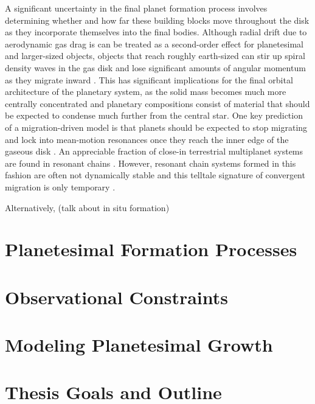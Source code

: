 A significant uncertainty in the final planet formation process involves determining whether and how far these building blocks move throughout the disk as they incorporate themselves into the final bodies. Although radial drift due to aerodynamic gas drag is can be treated as a second-order effect for planetesimal and larger-sized objects, objects that reach roughly earth-sized can stir up spiral density waves in the gas disk and lose significant amounts of angular momentum as they migrate inward \cite{ward97}. This has significant implications for the final orbital architecture of the planetary system, as the solid mass becomes much more centrally concentrated and planetary compositions consist of material that should be expected to condense much further from the central star. One key prediction of a migration-driven model is that planets should be expected to stop migrating and lock into mean-motion resonances once they reach the inner edge of the gaseous disk \cite{hands14}. An appreciable fraction of close-in terrestrial multiplanet systems are found in resonant chains \cite{gillon16, gillon17, christiansen18, agol21, leleu21}. However, resonant chain systems formed in this fashion are often not dynamically stable and this telltale signature of convergent migration is only temporary \cite{terquem07, pierens11, izidoro17, mcnally19}.

Alternatively, (talk about in situ formation)


\section{Planetesimal Formation Processes}
\section{Observational Constraints}
\section{Modeling Planetesimal Growth}
\section{Thesis Goals and Outline}